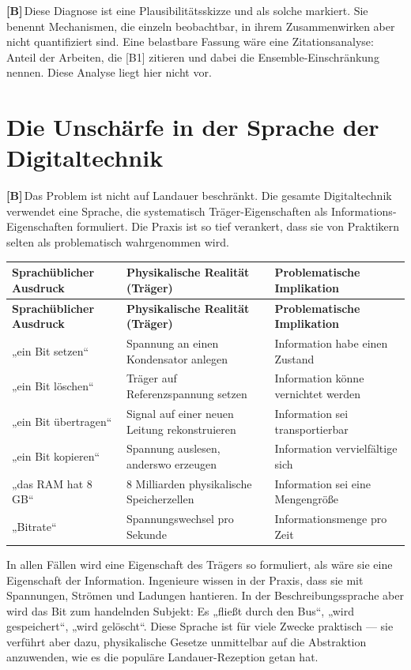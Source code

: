 \documentclass[11pt,a4paper]{article}
\newcommand{\LB}{\textcolor{layB}{\textbf{\footnotesize\textsf{[B]}}}\,}
\theoremstyle{ffgft}
\begin{document}
\LB Diese Diagnose ist eine Plausibilitätsskizze und als solche markiert. Sie
benennt Mechanismen, die einzeln beobachtbar, in ihrem Zusammenwirken aber nicht
quantifiziert sind. Eine belastbare Fassung wäre eine Zitationsanalyse: Anteil der
Arbeiten, die [B1] zitieren und dabei die Ensemble-Einschränkung nennen. Diese
Analyse liegt hier nicht vor.

\section{Die Unschärfe in der Sprache der Digitaltechnik}

\LB Das Problem ist nicht auf Landauer beschränkt. Die gesamte Digitaltechnik
verwendet eine Sprache, die systematisch Träger-Eigenschaften als
Informations-Eigenschaften formuliert. Die Praxis ist so tief verankert, dass sie
von Praktikern selten als problematisch wahrgenommen wird.

\begin{center}
\small
\begin{longtable}{@{}p{}p{}p{}@{}}
\toprule
\textbf{Sprachüblicher Ausdruck} & \textbf{Physikalische Realität (Träger)} & \textbf{Problematische Implikation} \\
\midrule
\endfirsthead
\toprule
\textbf{Sprachüblicher Ausdruck} & \textbf{Physikalische Realität (Träger)} & \textbf{Problematische Implikation} \\
\midrule
\endhead
„ein Bit setzen“ & Spannung an einen Kondensator anlegen & Information habe einen Zustand \\
„ein Bit löschen“ & Träger auf Referenzspannung setzen & Information könne vernichtet werden \\
„ein Bit übertragen“ & Signal auf einer neuen Leitung rekonstruieren & Information sei transportierbar \\
„ein Bit kopieren“ & Spannung auslesen, anderswo erzeugen & Information vervielfältige sich \\
„das RAM hat 8\,GB“ & 8 Milliarden physikalische Speicherzellen & Information sei eine Mengengröße \\
„Bitrate“ & Spannungswechsel pro Sekunde & Informationsmenge pro Zeit \\
\bottomrule
\end{longtable}
\end{center}

In allen Fällen wird eine Eigenschaft des Trägers so formuliert, als wäre sie eine
Eigenschaft der Information. Ingenieure wissen in der Praxis, dass sie mit
Spannungen, Strömen und Ladungen hantieren. In der Beschreibungssprache aber wird
das Bit zum handelnden Subjekt: Es „fließt durch den Bus“, „wird gespeichert“,
„wird gelöscht“. Diese Sprache ist für viele Zwecke praktisch --- sie verführt aber
dazu, physikalische Gesetze unmittelbar auf die Abstraktion anzuwenden, wie es die
populäre Landauer-Rezeption getan hat.
\end{document}
